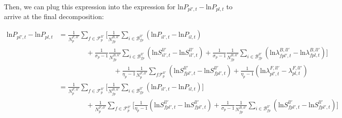 \noindent Then, we can plug this expression into the expression for $\text{ln} P_{pl',t} - \text{ln} P_{pl,t}$ to arrive at the final decomposition: 

\begin{linenomath*}    
\begin{equation*}
    \begin{aligned}
        \text{ln}P_{pl',t} - \text{ln} P_{pl,t} 
            &=  \frac{1}{N^{F,ll'}_{p}} \sum_{f \in \mathcal{F}^{ll'}_{p}} 
                \Bigg[
                    \frac{1}{N^{B,ll'}_{fp}} \sum_{i \in \mathcal{B}^{ll'}_{fp}} 
                    \left(\text{ln}P_{il',t} - \text{ln}P_{il,t} \right) \\
                    & \qquad \qquad
                    +   \frac{1}{\sigma_p-1} 
                        \frac{1}{N^{B,ll'}_{fp}} \sum_{i \in \mathcal{B}^{ll'}_{fp}} 
                        \left(\text{ln}S^{ll'}_{il',t} - \text{ln}S^{ll'}_{il',t} \right)
                    +   \frac{1}{\sigma_p-1} 
                        \frac{1}{N^{B,ll'}_{fp}} \sum_{i \in \mathcal{B}^{ll'}_{fp}} 
                        \left(\text{ln} \lambda^{B,ll'}_{fpl',t} - \text{ln}\lambda^{B,ll'}_{fpl,t} \right)  
                \Bigg] \\
                & \qquad \qquad \qquad \qquad 
                +   \frac{1}{\eta_p-1} 
                    \frac{1}{N^{F,ll'}_{p}} \sum_{f \mathcal{F}^{ll'}_{p}} 
                    \left(\text{ln}S^{ll'}_{fpl',t} - \text{ln}S^{ll'}_{fpl',t} \right) 
                +   \frac{1}{\eta_p-1} 
                    \left(\text{ln} \lambda^{F,ll'}_{pl',t} - \lambda^{F,ll'}_{pl,t} \right) \\
            &=  \frac{1}{N^{F,ll'}_{p}} \sum_{f \in \mathcal{F}^{ll'}_{p}} 
                \Bigg[
                    \frac{1}{N^{B,ll'}_{fp}} \sum_{i \in \mathcal{B}^{ll'}_{fp}} 
                    \left(\text{ln}P_{il',t} - \text{ln}P_{il,t} \right)
                \Bigg] \\
            & \qquad \qquad
                +   \frac{1}{N^{F,ll'}_{p}} \sum_{f \in \mathcal{F}^{ll'}_{p}}
                    \Bigg[ 
                        \frac{1}{\eta_p-1} 
                        \left(\text{ln}S^{ll'}_{fpl',t} - \text{ln}S^{ll'}_{fpl',t} \right)
                        + \frac{1}{\sigma_p-1} 
                        \frac{1}{N^{B,ll'}_{fp}} \sum_{i \in \mathcal{B}^{ll'}_{fp}} 
                        \left(\text{ln}S^{ll'}_{fpl',t} - \text{ln}S^{ll'}_{fpl',t} \right)
                    \Bigg] \\

\end{aligned}
\end{equation*}
\end{linenomath*}
